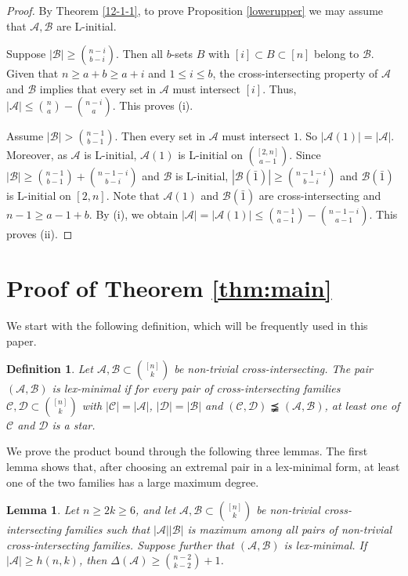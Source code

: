 \documentclass[a4paper,11pt]{article}
\newtheorem{definition}[theorem]{Definition}
\newtheorem{lemma}[theorem]{Lemma}
\newcommand{\m}{\mathcal}
\begin{document}
\begin{proof}
By Theorem \ref{12-1-1}, to prove Proposition \ref{lowerupper}  we may assume that $\m A, \m B$ are L-initial. 

Suppose $|\m B|\ge {n-i \choose b-i}$. Then all $b$-sets $B$ with $[i]\subset B\subset [n]$ belong to $\m B$. 
Given that $n\ge a+b\ge a+i$ and $1\le i\le b$, the cross-intersecting property of $\m A$ and $\m B$ implies that 
every set in $\m A$ must intersect $[i]$. 
Thus, $|\mathcal{A}|  \le {n\choose a}-{n-i\choose a}$. 
This proves (i).
 
Assume $|\m B|> {n-1 \choose b-1}$. 
Then every set in $\m A$ must intersect $1$. 
So $|\m A(1)|=|\m A|$. Moreover, as $\m A$ is L-initial, $\m A(1)$ is L-initial on ${[2, n]\choose a-1}$. 
Since $|\m B|\ge {n-1 \choose b-1}+{n-1-i\choose b-i}$ and $\m B$ is L-initial, $|\m B(\bar1)|\ge {n-1-i\choose b-i}$ and $\m B(\bar1)$ is L-initial on $[2,n]$. Note that $\m A(1)$ and $\m B(\bar1)$ are cross-intersecting and $n-1\ge a-1+b$. By (i), we obtain 
$|\m A|=|\m A(1)| \le {n-1\choose a-1}-{n-1-i\choose a-1}.
$ This proves (ii).
\end{proof}



\section{Proof of Theorem \ref{thm:main}}\label{sec:reduction}
We start with the following definition, which will be frequently used in this paper. 
\begin{definition}\label{lexmin}
Let $\m A,\m B\subset\binom{[n]}{k}$ be non-trivial cross-intersecting.
The pair $(\m A,\m B)$ is \emph{lex-minimal} if for every pair of
cross-intersecting families $\m C,\m D\subset\binom{[n]}{k}$ with
$|\m C|=|\m A|$, $|\m D|=|\m B|$ and $(\m C,\m D)\precneqq(\m A,\m B)$, at least
one of $\m C$ and $\m D$ is a star.
\end{definition}

We prove the product bound through the following three lemmas. The first lemma shows that, after choosing an extremal pair in a lex-minimal form, at least one of the two families has a large maximum degree. 

\begin{lemma}\label{mainlem0}
Let $n\ge 2k\ge 6$, and let $\mathcal{A}, \mathcal{B} \subset {[n]\choose k}$ be non-trivial  cross-intersecting families such that $|\m A||\m B|$ is maximum among all pairs of non-trivial  cross-intersecting families. 
Suppose further that $(\m A, \m B)$ is lex-minimal. 
If $|\mathcal{A}|\ge  h(n,k)$, then 
 $\Delta(\mathcal{A})\ge {n-2\choose k-2}+1$.
 \end{lemma}
\end{document}
